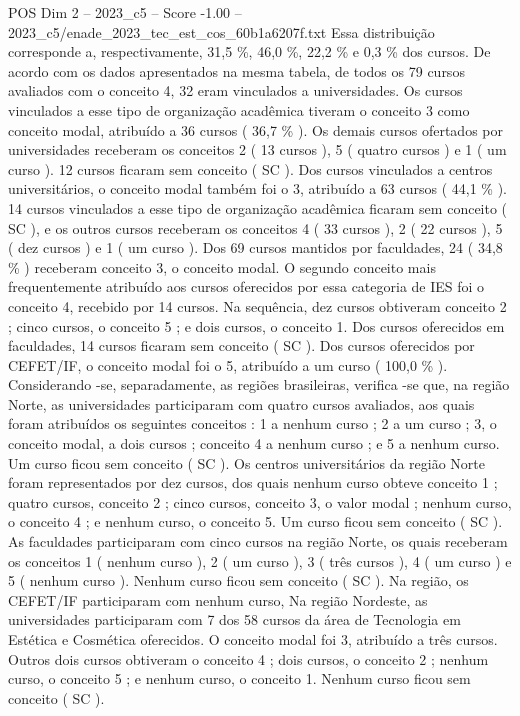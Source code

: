 \begin{textsample}{POS Dim 2 – 2023\_c5 – Score -1.00 – 2023\_c5/enade\_2023\_tec\_est\_cos\_60b1a6207f.txt}
Essa distribuição corresponde a, respectivamente, 31,5 \%, 46,0 \%, 22,2 \% e 0,3 \% dos cursos.
De acordo com os dados apresentados na mesma tabela, de todos os 79 cursos avaliados com o conceito 4, 32 eram vinculados a universidades.
Os cursos vinculados a esse tipo de organização acadêmica tiveram o conceito 3 como conceito modal, atribuído a 36 cursos ( 36,7 \% ).
Os demais cursos ofertados por universidades receberam os conceitos 2 ( 13 cursos ), 5 ( quatro cursos ) e 1 ( um curso ). 12 cursos ficaram sem conceito ( SC ).
Dos cursos vinculados a centros universitários, o conceito modal também foi o 3, atribuído a 63 cursos ( 44,1 \% ). 14 cursos vinculados a esse tipo de organização acadêmica ficaram sem conceito ( SC ), e os outros cursos receberam os conceitos 4 ( 33 cursos ), 2 ( 22 cursos ), 5 ( dez cursos ) e 1 ( um curso ).
Dos 69 cursos mantidos por faculdades, 24 ( 34,8 \% ) receberam conceito 3, o conceito modal.
O segundo conceito mais frequentemente atribuído aos cursos oferecidos por essa categoria de IES foi o conceito 4, recebido por 14 cursos.
Na sequência, dez cursos obtiveram conceito 2 ; cinco cursos, o conceito 5 ; e dois cursos, o conceito 1.
Dos cursos oferecidos em faculdades, 14 cursos ficaram sem conceito ( SC ).
Dos cursos oferecidos por CEFET/IF, o conceito modal foi o 5, atribuído a um curso ( 100,0 \% ).
Considerando -se, separadamente, as regiões brasileiras, verifica -se que, na região Norte, as universidades participaram com quatro cursos avaliados, aos quais foram atribuídos os seguintes conceitos : 1 a nenhum curso ; 2 a um curso ; 3, o conceito modal, a dois cursos ; conceito 4 a nenhum curso ; e 5 a nenhum curso.
Um curso ficou sem conceito ( SC ).
Os centros universitários da região Norte foram representados por dez cursos, dos quais nenhum curso obteve conceito 1 ; quatro cursos, conceito 2 ; cinco cursos, conceito 3, o valor modal ; nenhum curso, o conceito 4 ; e nenhum curso, o conceito 5.
Um curso ficou sem conceito ( SC ).
As faculdades participaram com cinco cursos na região Norte, os quais receberam os conceitos 1 ( nenhum curso ), 2 ( um curso ), 3 ( três cursos ), 4 ( um curso ) e 5 ( nenhum curso ).
Nenhum curso ficou sem conceito ( SC ).
Na região, os CEFET/IF participaram com nenhum curso, Na região Nordeste, as universidades participaram com 7 dos 58 cursos da área de Tecnologia em Estética e Cosmética oferecidos.
O conceito modal foi 3, atribuído a três cursos.
Outros dois cursos obtiveram o conceito 4 ; dois cursos, o conceito 2 ; nenhum curso, o conceito 5 ; e nenhum curso, o conceito 1.
Nenhum curso ficou sem conceito ( SC ).

\end{textsample}
